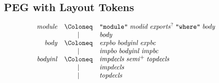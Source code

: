 \subsection{PEG with Layout Tokens}

\begin{align*}
  \begin{array}{rcl}
    \mathit{module}
    & \Coloneq & \text{\texttt{\textquotedbl module\textquotedbl}}\; \mathit{modid}\; \mathit{exports}^?\; \text{\texttt{\textquotedbl where\textquotedbl}}\; \mathit{body} \\
    & \mid & \mathit{body} \\
    \mathit{body}
    & \Coloneq & \mathit{expbo}\; \mathit{bodyinl}\; \mathit{expbc} \\
    & \mid & \mathit{impbo}\; \mathit{bodyinl}\; \mathit{impbc} \\
    \mathit{bodyinl}
    & \Coloneq & \mathit{impdecls}\; \mathit{semi}^+\; \mathit{topdecls} \\
    & \mid & \mathit{impdecls} \\
    & \mid & \mathit{topdecls} \\
  \end{array}
\end{align*}


